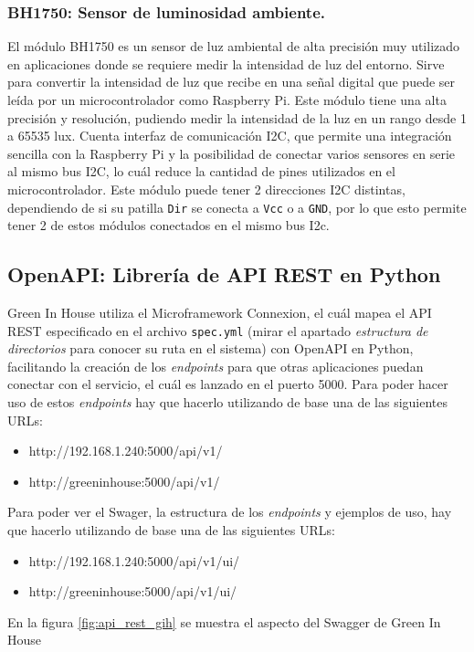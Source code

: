         \subsubsection{BH1750: Sensor de luminosidad ambiente.}  
        El módulo BH1750 es un sensor de luz ambiental de alta precisión muy utilizado en aplicaciones donde se requiere medir la intensidad de luz del entorno. Sirve para convertir la intensidad de luz que recibe en una señal digital que puede ser leída por un microcontrolador como Raspberry Pi.
        Este módulo tiene una alta precisión y resolución, pudiendo medir la intensidad de la luz en un rango desde 1 a 65535 lux. 
        Cuenta interfaz de comunicación I2C, que permite una integración sencilla con la Raspberry Pi y la posibilidad de conectar varios sensores en serie al mismo bus I2C, lo cuál reduce la cantidad de pines utilizados en el microcontrolador. Este módulo puede tener 2 direcciones I2C distintas, dependiendo de si su patilla \texttt{Dir} se conecta a \texttt{Vcc} o a \texttt{GND}, por lo que esto permite tener 2 de estos módulos conectados en el mismo bus I2c.

    \subsection{OpenAPI: Librería de API REST en Python}
    Green In House utiliza el Microframework Connexion, el cuál mapea el API REST especificado en el archivo \texttt{spec.yml} (mirar el apartado \textit{estructura de directorios} para conocer su ruta en el sistema) con OpenAPI \cite{wiki:openapi} en Python, facilitando la creación de los \textit{endpoints} para que otras aplicaciones puedan conectar con el servicio, el cuál es lanzado en el puerto 5000. Para poder hacer uso de estos \textit{endpoints} hay que hacerlo utilizando de base una de las siguientes URLs: 
    \begin{itemize}
        \item http://192.168.1.240:5000/api/v1/
        \item http://greeninhouse:5000/api/v1/
    \end{itemize}
    Para poder ver el Swager, la estructura de los \textit{endpoints} y ejemplos de uso, hay que hacerlo utilizando de base una de las siguientes URLs: 
    \begin{itemize}
        \item http://192.168.1.240:5000/api/v1/ui/
        \item http://greeninhouse:5000/api/v1/ui/
    \end{itemize}
    En la figura \ref{fig:api_rest_gih} se muestra el aspecto del Swagger de Green In House

